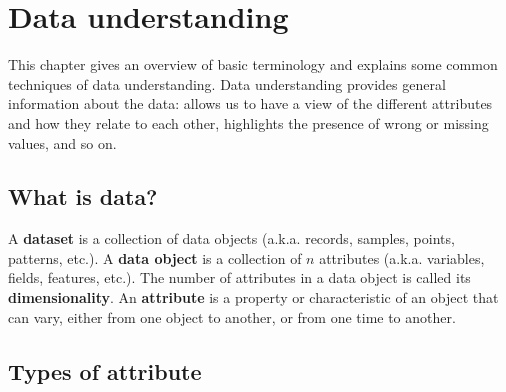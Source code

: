 \chapter{Data understanding}
This chapter gives an overview of basic terminology and explains some common techniques of data understanding. Data understanding provides general information about the data: allows us to have a view of the different attributes and how they relate to each other, highlights the presence of wrong or missing values, and so on.

\section{What is data?}

A \textbf{dataset} is a collection of data objects (a.k.a. records, samples, points, patterns, etc.).
A \textbf{data object} is a collection of $n$ attributes (a.k.a. variables, fields, features, etc.). The number of attributes in a data object is called its \textbf{dimensionality}.
An \textbf{attribute} is a property or characteristic of an object that can vary, either from one object to another, or from one time to another. 

\section{Types of attribute}



